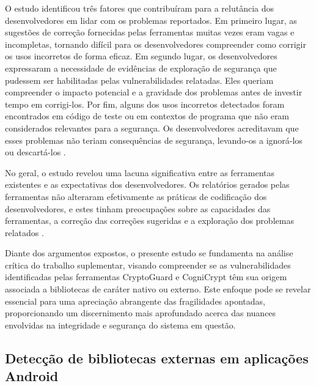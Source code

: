 O estudo identificou três fatores que contribuíram para a relutância dos desenvolvedores em lidar com os problemas reportados. Em primeiro lugar, as sugestões de correção fornecidas pelas ferramentas muitas vezes eram vagas e incompletas, tornando difícil para os desenvolvedores compreender como corrigir os usos incorretos de forma eficaz. Em segundo lugar, os desenvolvedores expressaram a necessidade de evidências de exploração de segurança que pudessem ser habilitadas pelas vulnerabilidades relatadas. Eles queriam compreender o impacto potencial e a gravidade dos problemas antes de investir tempo em corrigi-los. Por fim, alguns dos usos incorretos detectados foram encontrados em código de teste ou em contextos de programa que não eram considerados relevantes para a segurança. Os desenvolvedores acreditavam que esses problemas não teriam consequências de segurança, levando-os a ignorá-los ou descartá-los \cite{api_misuses_zhang}.

No geral, o estudo revelou uma lacuna significativa entre as ferramentas existentes e as expectativas dos desenvolvedores. Os relatórios gerados pelas ferramentas não alteraram efetivamente as práticas de codificação dos desenvolvedores, e estes tinham preocupações sobre as capacidades das ferramentas, a correção das correções sugeridas e a exploração dos problemas relatados \cite{api_misuses_zhang}.


Diante dos argumentos expostos, o presente estudo se fundamenta na análise crítica do trabalho suplementar, visando compreender se as vulnerabilidades identificadas pelas ferramentas CryptoGuard e CogniCrypt têm sua origem associada a bibliotecas de caráter nativo ou externo. Este enfoque pode se revelar essencial para uma apreciação abrangente das fragilidades apontadas, proporcionando um discernimento mais aprofundado acerca das nuances envolvidas na integridade e segurança do sistema em questão.

\subsection{Detecção de bibliotecas externas em aplicações Android} %

